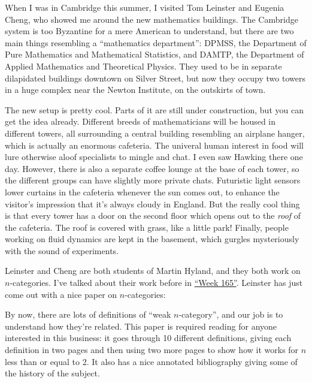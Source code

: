 \documentclass{article}
\def\tightlist{}
\renewcommand{\texttt}[1]{%
  \begingroup
  \ttfamily
  \begingroup\lccode`~=`/\lowercase{\endgroup\def~}{/\discretionary{}{}{}}%
  \begingroup\lccode`~=`[\lowercase{\endgroup\def~}{[\discretionary{}{}{}}%
  \begingroup\lccode`~=`.\lowercase{\endgroup\def~}{.\discretionary{}{}{}}%
  \catcode`/=\active\catcode`[=\active\catcode`.=\active
  \scantokens{#1\noexpand}%
  \endgroup
}
\begin{document}
When I was in Cambridge this summer, I visited Tom Leinster and Eugenia
Cheng, who showed me around the new mathematics buildings. The Cambridge
system is too Byzantine for a mere American to understand, but there are
two main things resembling a ``mathematics department'': DPMSS, the
Department of Pure Mathematics and Mathematical Statistics, and DAMTP,
the Department of Applied Mathematics and Theoretical Physics. They used
to be in separate dilapidated buildings downtown on Silver Street, but
now they occupy two towers in a huge complex near the Newton Institute,
on the outskirts of town.

The new setup is pretty cool. Parts of it are still under construction,
but you can get the idea already. Different breeds of mathematicians
will be housed in different towers, all surrounding a central building
resembling an airplane hanger, which is actually an enormous cafeteria.
The univeral human interest in food will lure otherwise aloof
specialists to mingle and chat. I even saw Hawking there one day.
However, there is also a separate coffee lounge at the base of each
tower, so the different groups can have slightly more private chats.
Futuristic light sensors lower curtains in the cafeteria whenever the
sun comes out, to enhance the visitor's impression that it's always
cloudy in England. But the really cool thing is that every tower has a
door on the second floor which opens out to the \emph{roof} of the
cafeteria. The roof is covered with grass, like a little park! Finally,
people working on fluid dynamics are kept in the basement, which gurgles
mysteriously with the sound of experiments.

Leinster and Cheng are both students of Martin Hyland, and they both
work on \(n\)-categories. I've talked about their work before in
\protect\hyperlink{week165}{``Week 165''}. Leinster has just come out
with a nice paper on \(n\)-categories:


By now, there are lots of definitions of ``weak \(n\)-category'', and
our job is to understand how they're related. This paper is required
reading for anyone interested in this business: it goes through 10
different definitions, giving each definition in two pages and then
using two more pages to show how it works for \(n\) less than or equal
to 2. It also has a nice annotated bibliography giving some of the
history of the subject.
\end{document}
